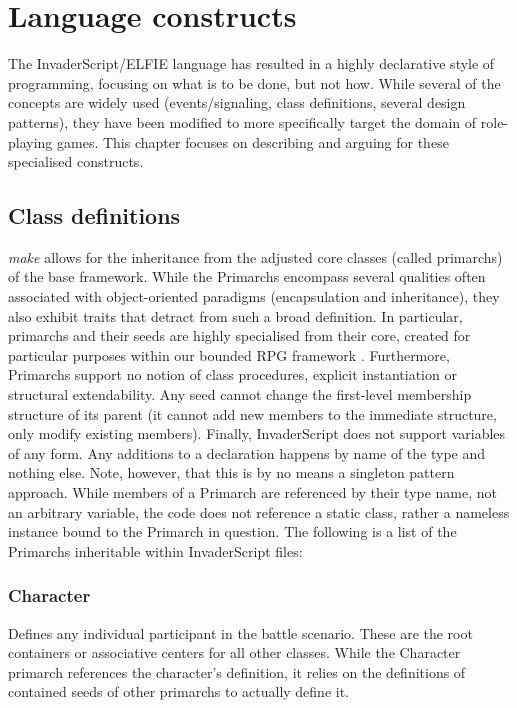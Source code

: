 \section{Language constructs}
The InvaderScript/ELFIE language has resulted in a highly declarative style of programming, focusing on what is to be done, but not how. While several of the concepts are widely used (events/signaling, class definitions, several design patterns), they have been modified to more specifically target the domain of role-playing games. This chapter focuses on describing and arguing for these specialised constructs.

\subsection{Class definitions}
\emph{make} allows for the inheritance from the adjusted core classes (called primarchs) of the base framework. While the Primarchs encompass several qualities often associated with object-oriented paradigms (encapsulation and inheritance), they also exhibit traits that detract from such a broad definition. In particular, primarchs and their seeds  are highly specialised from their core, created for particular purposes within our bounded RPG framework . Furthermore, Primarchs support no notion of class procedures, explicit instantiation or structural extendability. Any seed cannot change the first-level membership structure of its parent (it cannot add new members to the immediate structure, only modify existing members). Finally, InvaderScript does not support variables of any form. Any additions to a declaration happens by name of the type and nothing else. Note, however, that this is by no means a singleton pattern approach. While members of a Primarch are referenced by their type name, not an arbitrary variable, the code does not reference a static class, rather a nameless instance bound to the Primarch in question. The following is a list of the Primarchs inheritable within InvaderScript files:

\subsubsection{Character}
Defines any individual participant in the battle scenario. These are the root containers or associative centers for all other classes. While the Character primarch references the character's definition, it relies on the definitions of contained seeds of other primarchs to actually define it.

